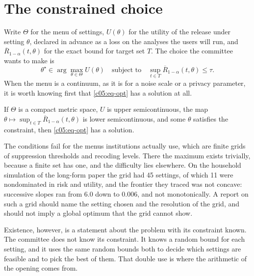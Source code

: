 \section{The constrained choice}

Write $\Theta$ for the menu of settings, $U(\theta)$ for the utility of the release under
setting $\theta$, declared in advance as a loss on the analyses the users will run, and
$\overline{R}_{1-\alpha}(t,\theta)$ for the exact bound for target set $T$. The choice
the committee wants to make is
\begin{equation}\label{c05:eq-opt}
\theta^\star \in \arg\max_{\theta \in \Theta} U(\theta)
\quad \text{subject to} \quad
\sup_{t \in T}\overline{R}_{1-\alpha}(t,\theta) \le \tau .
\end{equation}
When the menu is a continuum, as it is for a noise scale or a privacy parameter, it is
worth knowing first that \eqref{c05:eq-opt} has a solution at all.

\begin{proposition}[Existence]\label{c05:prop-exist}
If $\Theta$ is a compact metric space, $U$ is upper semicontinuous, the map
$\theta \mapsto \sup_{t\in T}\overline{R}_{1-\alpha}(t,\theta)$ is lower semicontinuous,
and some $\theta$ satisfies the constraint, then \eqref{c05:eq-opt} has a solution.
\end{proposition}

The conditions fail for the menus institutions actually use, which are finite grids of
suppression thresholds and recoding levels. There the maximum exists trivially, because a
finite set has one, and the difficulty lies elsewhere. On the household simulation of the
long-form paper the grid had 45 settings, of which 11 were nondominated in risk and
utility, and the frontier they traced was not concave: successive slopes ran from 6.0
down to 0.006, and not monotonically.
A report on such a grid should name the setting chosen and the resolution of the grid,
and should not imply a global optimum that the grid cannot show.

Existence, however, is a statement about the problem with its constraint known. The
committee does not know its constraint. It knows a random bound for each setting, and
it uses the same random bounds both to decide which settings are feasible and to pick
the best of them. That double use is where the arithmetic of the opening comes from.

